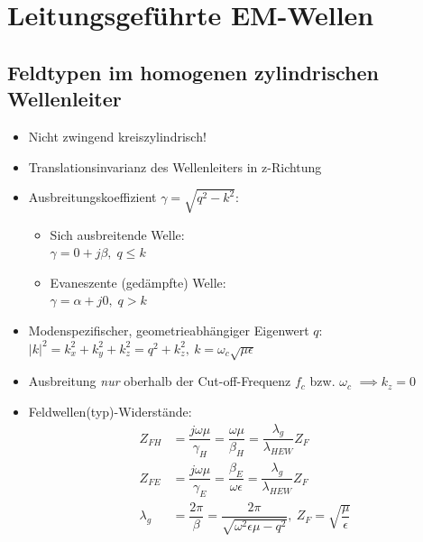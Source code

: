 \vspace{1cm}
\section{Leitungsgeführte EM-Wellen}
\subsection{Feldtypen im homogenen zylindrischen Wellenleiter}
\begin{itemize}
    \itemsep0pt
    \item Nicht zwingend kreiszylindrisch!
    \item Translationsinvarianz des Wellenleiters in z-Richtung
    \item Ausbreitungskoeffizient \(\gamma = \sqrt{q^2 - k^2}\):
        \begin{itemize}
            \itemsep0pt
            \item Sich ausbreitende Welle:\\
                \(\gamma = 0 + j\beta,\; q \leq k\)
            \item Evaneszente (gedämpfte) Welle:\\
                \(\gamma = \alpha + j0,\; q > k\)
        \end{itemize}
    \item Modenspezifischer, geometrieabhängiger Eigenwert \(q\):\\
        \(|k|^2 = k_x^2 + k_y^2 + k_z^2 = q^2 + k_z^2,\: k = \omega_c \sqrt{\mu\epsilon}\)
    \item Ausbreitung \textit{nur} oberhalb der Cut-off-Frequenz \(f_c\) bzw. \(\omega_c\) \(\implies k_z = 0\)\\
    \item Feldwellen(typ)-Widerstände:
        \begin{align*}
            Z_{FH} &= \dfrac{j\omega\mu}{\gamma_H} = \dfrac{\omega\mu}{\beta_H} = \dfrac{\lambda_g}{\lambda_{HEW}}Z_{F}\\
            Z_{FE} &= \dfrac{j\omega\mu}{\gamma_E} = \dfrac{\beta_E}{\omega\epsilon} = \dfrac{\lambda_g}{\lambda_{HEW}}Z_{F}\\
            \lambda_g &= \dfrac{2\pi}{\beta} = \dfrac{2\pi}{\sqrt{\omega^2\epsilon\mu - q^2}},\
            Z_F = \sqrt{\dfrac{\mu}{\epsilon}}
        \end{align*}
\end{itemize}
